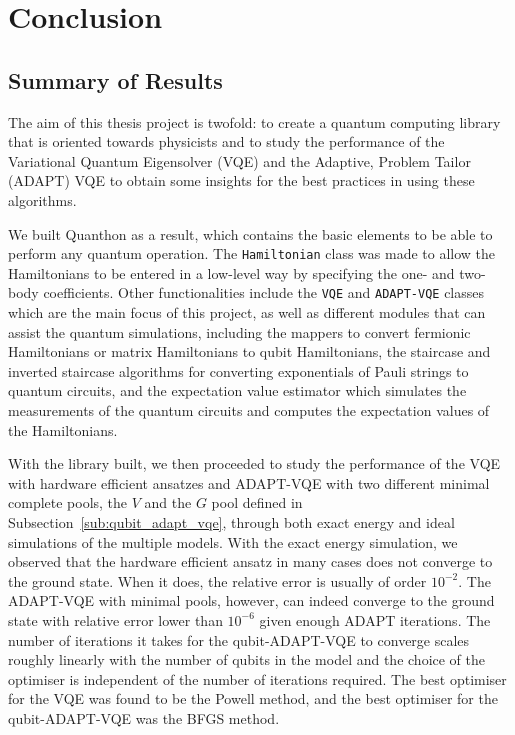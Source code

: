 
\chapter{Conclusion}

\section{Summary of Results}
The aim of this thesis project is twofold: to create a quantum computing library that is oriented towards physicists and to study the performance of the Variational Quantum Eigensolver (VQE) and the Adaptive, Problem Tailor (ADAPT) VQE to obtain some insights for the best practices in using these algorithms. 

We built Quanthon as a result, which contains the basic elements to be able to perform any quantum operation. The \texttt{Hamiltonian} class was made to allow the Hamiltonians to be entered in a low-level way by specifying the one- and two-body coefficients. Other functionalities include the \texttt{VQE} and \texttt{ADAPT-VQE} classes which are the main focus of this project, as well as different modules that can assist the quantum simulations, including the mappers to convert fermionic Hamiltonians or matrix Hamiltonians to qubit Hamiltonians, the staircase and inverted staircase algorithms for converting exponentials of Pauli strings to quantum circuits, and the expectation value estimator which simulates the measurements of the quantum circuits and computes the expectation values of the Hamiltonians. 

With the library built, we then proceeded to study the performance of the VQE with hardware efficient ansatzes and ADAPT-VQE with two different minimal complete pools, the $ V $ and the $ G $ pool defined in Subsection~\ref{sub:qubit_adapt_vqe}, through both exact energy and ideal simulations of the multiple models. With the exact energy simulation, we observed that the hardware efficient ansatz in many cases does not converge to the ground state. When it does, the relative error is usually of order $ 10^{-2} $. The ADAPT-VQE with minimal pools, however, can indeed converge to the ground state with relative error lower than $ 10^{-6} $ given enough ADAPT iterations. The number of iterations it takes for the qubit-ADAPT-VQE to converge scales roughly linearly with the number of qubits in the model and the choice of the optimiser is independent of the number of iterations required. The best optimiser for the VQE was found to be the Powell method, and the best optimiser for the qubit-ADAPT-VQE was the BFGS method. 

